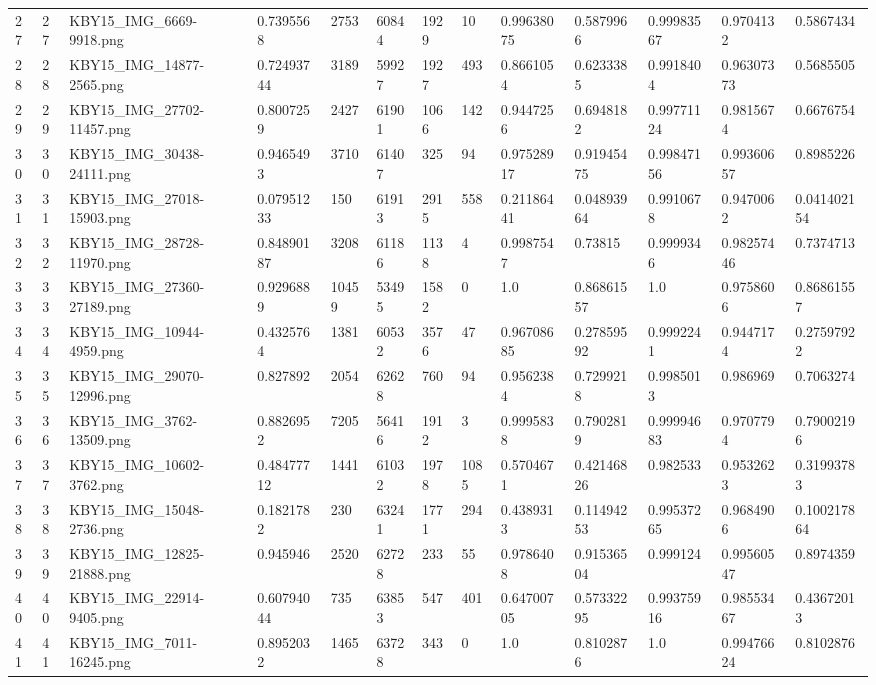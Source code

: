 \documentclass[11pt, a4paper, twoside]{report}
\begin{document}
\begin{longtable}[c]{@{}lllllllllllll@{}}
27 & 27 & KBY15\_IMG\_6669-9918.png & 0.7395568 & 2753 & 60844 & 1929 & 10 & 0.99638075 & 0.5879966 & 0.99983567 & 0.9704132 & 0.5867434 \\
28 & 28 & KBY15\_IMG\_14877-2565.png & 0.72493744 & 3189 & 59927 & 1927 & 493 & 0.8661054 & 0.6233385 & 0.9918404 & 0.96307373 & 0.5685505 \\
29 & 29 & KBY15\_IMG\_27702-11457.png & 0.8007259 & 2427 & 61901 & 1066 & 142 & 0.9447256 & 0.6948182 & 0.99771124 & 0.9815674 & 0.6676754 \\
30 & 30 & KBY15\_IMG\_30438-24111.png & 0.9465493 & 3710 & 61407 & 325 & 94 & 0.97528917 & 0.91945475 & 0.99847156 & 0.99360657 & 0.8985226 \\
31 & 31 & KBY15\_IMG\_27018-15903.png & 0.07951233 & 150 & 61913 & 2915 & 558 & 0.21186441 & 0.04893964 & 0.9910678 & 0.9470062 & 0.041402154 \\
32 & 32 & KBY15\_IMG\_28728-11970.png & 0.84890187 & 3208 & 61186 & 1138 & 4 & 0.9987547 & 0.73815 & 0.9999346 & 0.98257446 & 0.7374713 \\
33 & 33 & KBY15\_IMG\_27360-27189.png & 0.9296889 & 10459 & 53495 & 1582 & 0 & 1.0 & 0.86861557 & 1.0 & 0.9758606 & 0.86861557 \\
34 & 34 & KBY15\_IMG\_10944-4959.png & 0.4325764 & 1381 & 60532 & 3576 & 47 & 0.96708685 & 0.27859592 & 0.9992241 & 0.9447174 & 0.27597922 \\
35 & 35 & KBY15\_IMG\_29070-12996.png & 0.827892 & 2054 & 62628 & 760 & 94 & 0.9562384 & 0.7299218 & 0.9985013 & 0.986969 & 0.7063274 \\
36 & 36 & KBY15\_IMG\_3762-13509.png & 0.8826952 & 7205 & 56416 & 1912 & 3 & 0.9995838 & 0.7902819 & 0.99994683 & 0.9707794 & 0.79002196 \\
37 & 37 & KBY15\_IMG\_10602-3762.png & 0.48477712 & 1441 & 61032 & 1978 & 1085 & 0.5704671 & 0.42146826 & 0.982533 & 0.9532623 & 0.31993783 \\
38 & 38 & KBY15\_IMG\_15048-2736.png & 0.1821782 & 230 & 63241 & 1771 & 294 & 0.4389313 & 0.11494253 & 0.99537265 & 0.9684906 & 0.100217864 \\
39 & 39 & KBY15\_IMG\_12825-21888.png & 0.945946 & 2520 & 62728 & 233 & 55 & 0.9786408 & 0.91536504 & 0.999124 & 0.99560547 & 0.8974359 \\
40 & 40 & KBY15\_IMG\_22914-9405.png & 0.60794044 & 735 & 63853 & 547 & 401 & 0.64700705 & 0.57332295 & 0.99375916 & 0.98553467 & 0.43672013 \\
41 & 41 & KBY15\_IMG\_7011-16245.png & 0.8952032 & 1465 & 63728 & 343 & 0 & 1.0 & 0.8102876 & 1.0 & 0.99476624 & 0.8102876 \\

\end{longtable}
\end{document}
